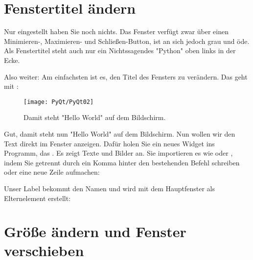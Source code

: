 
    
\PYTHON{}


\section{Fenstertitel ändern}


Nur eingestellt haben Sie noch nichts. Das Fenster verfügt zwar über einen Minimieren-, Maximieren- und Schließen-Button, ist an sich jedoch grau und öde. Als Fenstertitel steht auch nur ein Nichtssagendes "Python" oben links in der Ecke.
    
Also weiter: Am einfachsten ist es, den Titel des Fensters zu verändern. Das geht mit :
    
\medskip

    
\medskip

\begin{figure}
    \centering
    \texttt{[image: PyQt/PyQt02]}    
    \caption{Damit steht "Hello World" auf dem Bildschirm.}\label{PyQt02}
\end{figure}     

    

Gut, damit steht nun "Hello World" auf dem Bildschirm. Nun wollen wir den Text direkt im Fenster anzeigen. Dafür holen Sie ein neues Widget ins Programm, das . Es zeigt Texte und Bilder an. Sie importieren es wie  oder , indem Sie  getrennt durch ein Komma hinter den bestehenden Befehl  schreiben oder eine neue Zeile aufmachen:
    
\medskip


\medskip

Unser Label bekommt den Namen  und wird mit dem Hauptfenster  als Elternelement erstellt:
    
\medskip



\section{Größe ändern und Fenster verschieben}

